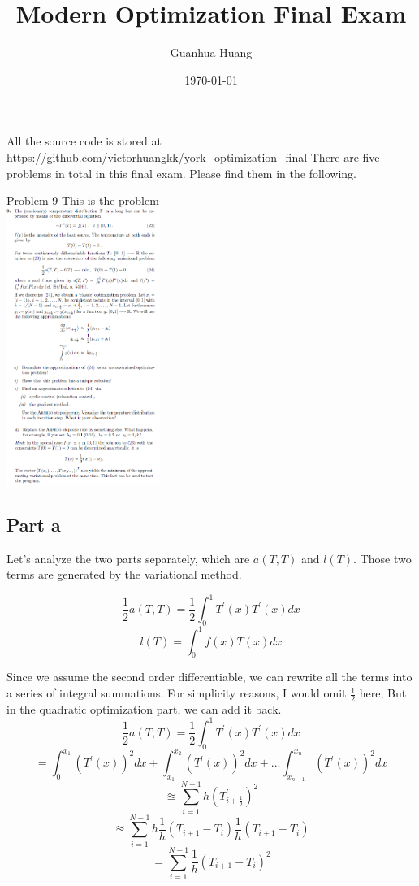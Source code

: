 \documentclass[10pt]{article}
\title{Modern Optimization Final Exam}
\author{Guanhua Huang}
\date\today
\begin{document}
\maketitle %
All the source code is stored at \url{https://github.com/victorhuangkk/york_optimization_final}
There are five problems in total in this final exam. Please find them in the following. 

\begin{section}{Problem 9}
This is the problem \\
\includegraphics[width=5cm]{img/problem9.png}
\subsection{Part a}

Let's analyze the two parts separately, which are $a(T, T)$ and $l(T)$. Those two terms are generated by the variational method. 

\[\frac{1}{2}a(T, T) = \frac{1}{2} \int_{0}^{1}T^\prime(x)T^{\prime}(x) dx\]
\[l(T) = \int_{0}^{1} f(x)T(x)dx\]

Since we assume the second order differentiable, we can rewrite all the terms into a series of integral summations. For simplicity reasons, I would omit $\frac{1}{2}$ here, But in the quadratic optimization part, we can add it back. 
\[\frac{1}{2}a(T, T) = \frac{1}{2} \int_{0}^{1}T^\prime(x)T^{\prime}(x) dx\]
\[= \int_{0}^{x_1}(T^{\prime}(x))^2dx + \int_{x_1}^{x_2}(T^{\prime}(x))^2dx + ... \int_{x_{n-1}}^{x_n}(T^{\prime}(x))^2dx\]
\[\approxeq \sum_{i=1}^{N-1}h (T^{\prime}_{i+\frac{1}{2}})^2\]
\[\approxeq \sum_{i=1}^{N-1}h \frac{1}{h}(T_{i+1} - T_{i})\frac{1}{h}(T_{i+1} - T_{i})\]
\[= \sum_{i=1}^{N-1}\frac{1}{h}(T_{i+1} - T_{i})^2\]



\end{section}
\end{document}
